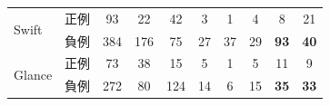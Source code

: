 \documentclass[T,J]{fose} %
\begin{document}
\begin{table}[]
{\begin{tabular}{l|l|c|c|c|ccc|c|c}
\multirow{2}{*}{Swift}    & 正例                     & 93                    & 22                      & 42                       & 3     & 1     & 4    & 8     & 21                            \\
                          & 負例                     & 384                   & 176                     & 75                       & 27    & 37    & 29   & {\textbf{93}}    & {\textbf{40}}                            \\ \hline
\multirow{2}{*}{Glance}   & 正例                     & 73                    & 38                      & 15                       & 5     & 1     & 5    & 11    & 9                             \\
                          & 負例                     & 272                   & 80                      & 124                      & 14    & 6     & 15   & {\textbf{35}}    & {\textbf{33}}  \\ \hline                         
\end{tabular}}
\end{table}
\end{document}
